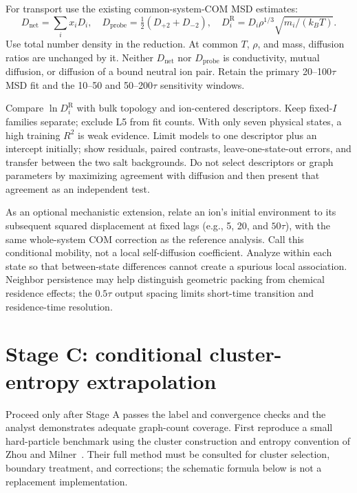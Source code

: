 \documentclass[11pt,a4paper]{article}
\begin{document}
For transport use the existing common-system-COM MSD estimates:
\begin{equation}
D_{\mathrm{net}}=\sum_i x_iD_i,\quad
D_{\mathrm{probe}}=\tfrac12(D_{+2}+D_{-2}),\quad
D_i^{\mathrm R}=D_i\rho^{1/3}\sqrt{m_i/(k_BT)}.
\end{equation}
Use total number density in the reduction. At common $T$, $\rho$, and mass,
diffusion ratios are unchanged by it. Neither $D_{\mathrm{net}}$ nor
$D_{\mathrm{probe}}$ is conductivity, mutual diffusion, or diffusion of a
bound neutral ion pair. Retain the primary 20--100$\tau$ MSD fit and the
10--50 and 50--200$\tau$ sensitivity windows.

Compare $\ln D_i^{\mathrm R}$ with bulk topology and ion-centered descriptors.
Keep fixed-$I$ families separate; exclude L5 from fit counts. With only seven
physical states, a high training $R^2$ is weak evidence. Limit models to one
descriptor plus an intercept initially; show residuals, paired contrasts,
leave-one-state-out errors, and transfer between the two salt backgrounds.
Do not select descriptors or graph parameters by maximizing agreement with
diffusion and then present that agreement as an independent test.

As an optional mechanistic extension, relate an ion's initial environment to
its subsequent squared displacement at fixed lags (e.g., 5, 20, and $50\tau$),
with the same whole-system COM correction as the reference analysis. Call
this conditional mobility, not a local self-diffusion coefficient. Analyze
within each state so that between-state differences cannot create a spurious
local association. Neighbor persistence may help distinguish geometric packing
from chemical residence effects; the $0.5\tau$ output spacing limits short-time
transition and residence-time resolution.

\section{Stage C: conditional cluster-entropy extrapolation}
Proceed only after Stage A passes the label and convergence checks and the
analyst demonstrates adequate graph-count coverage. First reproduce a small
hard-particle benchmark using the cluster construction and entropy convention
of Zhou and Milner~\cite{Zhou2016}. Their full method must be consulted for
cluster selection, boundary treatment, and corrections; the schematic formula
below is not a replacement implementation.
\end{document}
